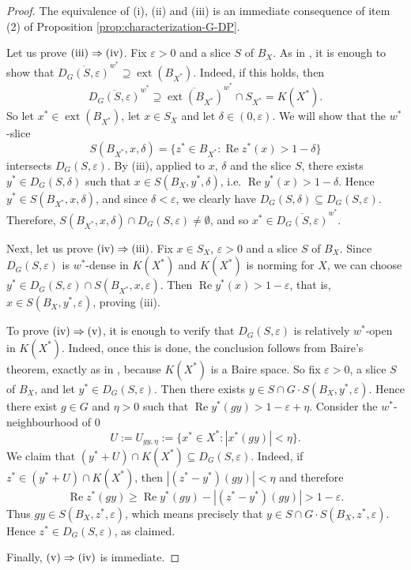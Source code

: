 \documentclass[a4paper,12pt]{amsart}
\theoremstyle{definition}
\theoremstyle{definition}
\theoremstyle{remark}
\numberwithin{equation}{section}
\DeclareMathOperator{\re}{Re}
\renewcommand{\geq}{\geqslant}
\newcommand{\<}{\langle}
\renewcommand{\>}{\rangle}
\newcommand{\e}{\varepsilon}
\newcommand{\ext}{\operatorname{ext}}
\begin{document}
	\begin{proof}
		The equivalence of (i), (ii) and (iii) is an immediate consequence of item (2) of Proposition \ref{prop:characterization-G-DP}.
		
		Let us prove $\textup{(iii)} \Rightarrow \textup{(iv)}$.
		Fix $\e > 0$ and a slice $S$ of $B_X$.
		As in \cite[Proposition 4.2]{AKMMS}, it is enough to show that $\overline{D_G(S,\e)}^{w^*} \supseteq \ext(B_{X^*})$. Indeed, if this holds, then
		\begin{equation*}
			\overline{D_G(S,\e)}^{w^*}
			\supseteq
			\overline{\ext(B_{X^*})}^{w^*} \cap S_{X^*}
			=
			K(X^*).
		\end{equation*}
		So let $x^* \in \ext(B_{X^*})$, let $x \in S_X$ and let $\delta \in (0,\e)$.
		We will show that the $w^*$-slice
		\begin{equation*}
			S(B_{X^*}, x, \delta)
			=
			\{z^* \in B_{X^*}: \re z^*(x) > 1-\delta\}
		\end{equation*}
		intersects $D_G(S,\e)$.
		By (iii), applied to $x$, $\delta$ and the slice $S$, there exists $y^* \in D_G(S,\delta)$ such that $x \in S(B_X, y^*, \delta)$, i.e. $\re y^*(x) > 1-\delta$. Hence $y^* \in S(B_{X^*}, x, \delta)$, and since $\delta < \e$, we clearly have $D_G(S,\delta) \subseteq D_G(S,\e)$. Therefore,  $S(B_{X^*}, x, \delta) \cap D_G(S,\e) \not= \emptyset$, and so $x^* \in \overline{D_G(S,\e)}^{w^*}$.
		
		Next, let us prove $\textup{(iv)} \Rightarrow \textup{(iii)}$.
		Fix $x \in S_X$, $\e > 0$ and a slice $S$ of $B_X$.
		Since $D_G(S,\e)$ is $w^*$-dense in $K(X^*)$ and $K(X^*)$ is norming for $X$, we can choose $y^* \in D_G(S,\e) \cap S(B_{X^*}, x, \e)$. Then $\re y^*(x) > 1-\e$, that is, $x \in S(B_X, y^*, \e)$, proving (iii).
		
		To prove $\textup{(iv)} \Rightarrow \textup{(v)}$, it is enough to verify that $D_G(S,\e)$ is relatively $w^*$-open in $K(X^*)$.
		Indeed, once this is done, the conclusion follows from Baire's theorem, exactly as in \cite[Proposition 4.2]{AKMMS}, because $K(X^*)$ is a Baire space. So fix $\e > 0$, a slice $S$ of $B_X$, and let $y^* \in D_G(S,\e)$. Then there exists $y \in S \cap G \cdot S(B_X, y^*, \e)$. Hence there exist $g \in G$ and $\eta > 0$ such that $\re y^*(gy) > 1-\e+\eta$. Consider the $w^*$-neighbourhood of $0$
		\begin{equation*}
			U:=U_{gy,\eta}
			:=
			\{x^* \in X^*: |x^*(gy)| < \eta\}.
		\end{equation*}
		We claim that $(y^*+U)\cap K(X^*) \subseteq D_G(S,\e)$. Indeed, if $z^* \in (y^*+U)\cap K(X^*)$, then  $|(z^*-y^*)(gy)|<\eta$  and therefore
		\begin{equation*}
			\re z^*(gy)
			\geq
			\re y^*(gy) - |(z^*-y^*)(gy)|
			> 1-\e.
		\end{equation*}
		Thus $gy \in S(B_X, z^*, \e)$, which means precisely that $y \in S \cap G \cdot S(B_X, z^*, \e)$. Hence $z^* \in D_G(S,\e)$, as claimed.
		
		Finally, $\textup{(v)} \Rightarrow \textup{(iv)}$ is immediate.
	\end{proof}
	
\end{document}
